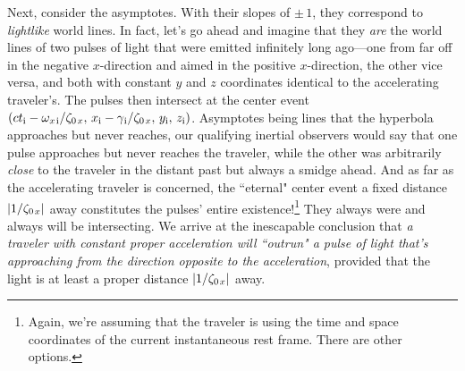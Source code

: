 \documentclass[12pt]{article}
\begin{document}
Next, consider the asymptotes. With their slopes of $\pm \, 1$, they correspond to \emph{lightlike} world lines. In fact, let's go ahead and imagine that they \emph{are} the world lines of two pulses of light that were emitted infinitely long ago---one from far off in the negative $x$-direction and aimed in the positive $x$-direction, the other vice versa, and both with constant $y$ and $z$ coordinates identical to the accelerating traveler's. The pulses then intersect at the center event $(ct_{\mathrm{i}} - \omega_{x \mkern2mu \textrm{i} } / \zeta_{0 \mkern2mu x}, \, x_{\mathrm{i}} - \gamma_{\mkern1mu \mathrm{i}} / \zeta_{0 \mkern2mu x}, \, y_{\mathrm{i}}, \, z_{\mathrm{i}})$. Asymptotes being lines that the hyperbola approaches but never reaches, our qualifying inertial observers would say that one pulse approaches but never reaches the traveler, while the other was arbitrarily \emph{close} to the traveler in the distant past but always a smidge ahead. And as far as the accelerating traveler is concerned, the ``eternal" center event a fixed distance $|1 / \zeta_{0 \mkern2mu x}|$ away constitutes the pulses' entire existence!\footnote{Again, we're assuming that the traveler is using the time and space coordinates of the current instantaneous rest frame. There are other options.} They always were and always will be intersecting. We arrive at the inescapable conclusion that \emph{a traveler with constant proper acceleration will ``outrun" a pulse of light that's approaching from the direction opposite to the acceleration}, provided that the light is at least a proper distance $|1 / \zeta_{0 \mkern2mu x}|$ away.
\end{document}
